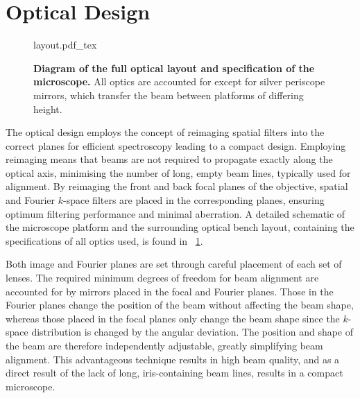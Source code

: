 \documentclass{article}
\begin{document}
\section{Optical Design}

\begin{figure}[p]
\centering
\fontsize{9.5pt}{1em}\selectfont
\def\svgwidth{0.93\textwidth}
{layout.pdf_tex}
\caption[Diagram of the full optical layout]{\textbf{Diagram of the full optical layout and specification of the microscope.} All optics are accounted for except for silver periscope mirrors, which transfer the beam between platforms of differing height.}
\label{fig:layout}
\end{figure}

The optical design employs the concept of reimaging spatial filters into the correct planes for efficient spectroscopy leading to a compact design. Employing reimaging means that beams are not required to propagate exactly along the optical axis, minimising the number of long, empty beam lines, typically used for alignment. By reimaging the front and back focal planes of the objective, spatial and Fourier $k$-space filters are placed in the corresponding planes, ensuring optimum filtering performance and minimal aberration. A detailed schematic of the microscope platform and the surrounding optical bench layout, containing the specifications of all optics used, is found in \figurename~\ref{fig:layout}.

Both image and Fourier planes are set through careful placement of each set of lenses. The required minimum degrees of freedom for beam alignment are accounted for by mirrors placed in the focal and Fourier planes. Those in the Fourier planes change the position of the beam without affecting the beam shape, whereas those placed in the focal planes only change the beam shape since the $k$-space distribution is changed by the angular deviation. The position and shape of the beam are therefore independently adjustable, greatly simplifying beam alignment. This advantageous technique results in high beam quality, and as a direct result of the lack of long, iris-containing beam lines, results in a compact microscope.
\end{document}

